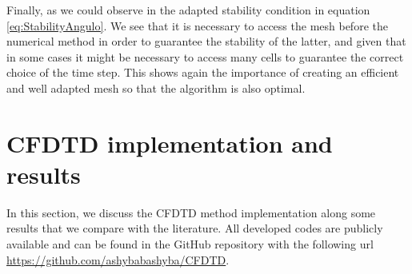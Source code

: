 \documentclass[12pt, oneside]{book}
\begin{document}
Finally, as we could observe in the adapted stability condition in equation \ref{eq:StabilityAngulo}. We see that it is necessary to access the mesh before the numerical method in order to guarantee the stability of the latter, and given that in some cases it might be necessary to access many cells to guarantee the correct choice of the time step. This shows again the importance of creating an efficient and well adapted mesh so that the algorithm is also optimal.

\chapter{CFDTD implementation and results}
In this section, we discuss the CFDTD method implementation along some results that we compare with the literature. All developed codes are publicly available and can be found in the GitHub repository with the following url \url{https://github.com/ashybabashyba/CFDTD}. 
\end{document}
